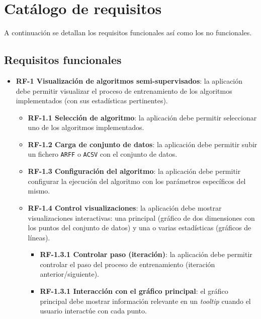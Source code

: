 \section{Catálogo de requisitos}


A continuación se detallan los requisitos funcionales así como los no
funcionales.

\subsection{Requisitos funcionales}

\begin{itemize}
	\item \textbf{RF-1 Visualización de algoritmos semi-supervisados}: la
	aplicación debe permitir visualizar el proceso de entrenamiento de los
	algoritmos implementados (con sus estadísticas pertinentes).
    \begin{itemize}
        \item \textbf{RF-1.1 Selección de algoritmo}: la aplicación debe
        permitir seleccionar uno de los algoritmos implementados.
        \item \textbf{RF-1.2 Carga de conjunto de datos}: la aplicación debe
        permitir subir un fichero \texttt{ARFF} o \texttt{ACSV} con el conjunto
        de datos. 
        \item \textbf{RF-1.3 Configuración del algoritmo}: la aplicación debe
        permitir configurar la ejecución del algoritmo con los parámetros
        específicos del mismo.
        \item \textbf{RF-1.4 Control visualizaciones}: la aplicación debe
        mostrar visualizaciones interactivas: una principal (gráfico de dos
        dimensiones con los puntos del conjunto de datos) y una o varias
        estadísticas (gráficos de líneas).
        \begin{itemize}
            \item \textbf{RF-1.3.1 Controlar paso (iteración)}: la aplicación
            debe permitir controlar el paso del proceso de entrenamiento
            (iteración anterior/siguiente).
            \item \textbf{RF-1.3.1 Interacción con el gráfico principal}: el
            gráfico principal debe mostrar información relevante en un
            \textit{tooltip} cuando el usuario interactúe con cada punto.
        \end{itemize}
    \end{itemize}
    

\end{itemize}

